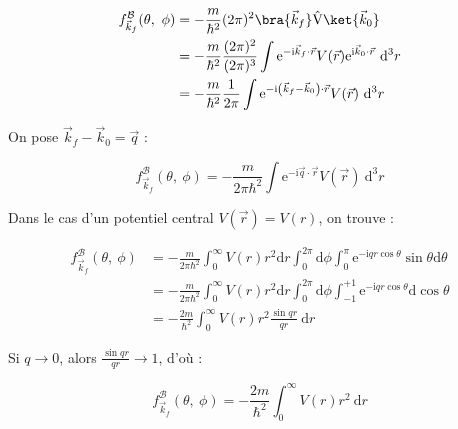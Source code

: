 \documentclass[12pt,a4paper,oneside,french]{book}
\renewcommand{\i}{\mathrm{i}}
\newcommand{\e}{\mathrm{e}}
\newcommand{\opr}[1]{\mathrm{\hat{#1}}}
\newcommand{\diff}{\mathrm{d}}
\theoremstyle{definition}
\theoremstyle{definition}
\theoremstyle{definition}
\theoremstyle{remark}
\theoremstyle{definition}
\begin{document}
    \begin{equation*}
    \begin{split}
        {f}_{{\vec{k}}_{f}}^{\mathcal{B}}(\theta, \ \phi) 
            &= -\frac{m}{{\hbar}^{2}} (2\pi)^{2} \bra{{\vec{k}}_{f} \vphantom{{\Psi}_{{\vec{k}}_{f}}^{+}}} \opr{V} \ket{{\vec{k}}_{0} \vphantom{{\Psi}_{{\vec{k}}_{f}}^{+}}} \\
            &= -\frac{m}{{\hbar}^{2}} \frac{(2\pi)^{2}}{(2\pi)^{3}} \int {\e}^{-\i {\vec{k}}_{f} \cdot \vec{r}} V(\vec{r}) {\e}^{\i {\vec{k}}_{0} \cdot \vec{r}} \ {\diff}^{3} r \\
            &= -\frac{m}{{\hbar}^{2}} \frac{1}{2\pi} \int {\e}^{-\i \left({\vec{k}}_{f} - {\vec{k}}_{0}\right) \cdot \vec{r}} V(\vec{r}) \ {\diff}^{3} r \\
    \end{split}
    \end{equation*}
    
    On pose ${\vec{k}}_{f} - {\vec{k}}_{0} = \vec{q}$ :
    
    \begin{equation*}
        {f}_{{\vec{k}}_{f}}^{\mathcal{B}}(\theta, \ \phi) = -\frac{m}{2\pi {\hbar}^{2}} \int {\e}^{-\i \vec{q} \cdot \vec{r}} V(\vec{r}) \ {\diff}^{3} r
    \end{equation*}
    
    Dans le cas d'un potentiel central $V(\vec{r}) = V(r)$, on trouve :
    
    \begin{equation*}
    \begin{split}
        {f}_{{\vec{k}}_{f}}^{\mathcal{B}}(\theta, \ \phi)
            &= -\frac{m}{2\pi {\hbar}^{2}} \int_{0}^{\infty} V(r) {r}^{2} \diff r \int_{0}^{2\pi} \diff \phi \int_{0}^{\pi} {\e}^{-\i q r \cos{\theta}} \sin{\theta} \diff \theta \\
            &= -\frac{m}{2\pi {\hbar}^{2}} \int_{0}^{\infty} V(r) {r}^{2} \diff r \int_{0}^{2\pi} \diff \phi \int_{-1}^{+1} {\e}^{-\i q r \cos{\theta}} \diff \cos{\theta} \\
            &= -\frac{2m}{{\hbar}^{2}} \int_{0}^{\infty} V(r) {r}^{2} \frac{\sin{q r}}{q r} \ \diff r
    \end{split}
    \end{equation*}
    
    Si $q \to 0$, alors $\frac{\sin{q r}}{q r} \to 1$, d'où :
    
    \begin{equation*}
        {f}_{{\vec{k}}_{f}}^{\mathcal{B}}(\theta, \ \phi) = -\frac{2m}{{\hbar}^{2}} \int_{0}^{\infty} V(r) {r}^{2} \ \diff r
    \end{equation*}
    
\end{document}
